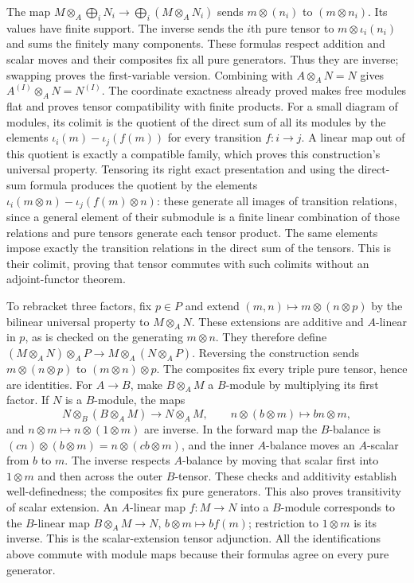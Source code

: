 \documentclass[11pt,a4paper,openany]{report}
\begin{document}
The map \(M\otimes_A\bigoplus_i N_i\to\bigoplus_i(M\otimes_A N_i)\) sends \(m\otimes(n_i)\) to \((m\otimes n_i)\). Its values have finite support. The inverse sends the \(i\)th pure tensor to \(m\otimes\iota_i(n_i)\) and sums the finitely many components. These formulas respect addition and scalar moves and their composites fix all pure generators. Thus they are inverse; swapping proves the first-variable version. Combining with \(A\otimes_A N=N\) gives \(A^{(I)}\otimes_A N=N^{(I)}\). The coordinate exactness already proved makes free modules flat and proves tensor compatibility with finite products. For a small diagram of modules, its colimit is the quotient of the direct sum of all its modules by the elements \(\iota_i(m)-\iota_j(f(m))\) for every transition \(f:i\to j\). A linear map out of this quotient is exactly a compatible family, which proves this construction's universal property. Tensoring its right exact presentation and using the direct-sum formula produces the quotient by the elements \(\iota_i(m\otimes n)-\iota_j(f(m)\otimes n)\): these generate all images of transition relations, since a general element of their submodule is a finite linear combination of those relations and pure tensors generate each tensor product. The same elements impose exactly the transition relations in the direct sum of the tensors. This is their colimit, proving that tensor commutes with such colimits without an adjoint-functor theorem.

To rebracket three factors, fix \(p\in P\) and extend \((m,n)\mapsto m\otimes(n\otimes p)\) by the bilinear universal property to \(M\otimes_A N\). These extensions are additive and \(A\)-linear in \(p\), as is checked on the generating \(m\otimes n\). They therefore define \((M\otimes_A N)\otimes_A P\to M\otimes_A(N\otimes_A P)\). Reversing the construction sends \(m\otimes(n\otimes p)\) to \((m\otimes n)\otimes p\). The composites fix every triple pure tensor, hence are identities. For \(A\to B\), make \(B\otimes_A M\) a \(B\)-module by multiplying its first factor. If \(N\) is a \(B\)-module, the maps \[
N\otimes_B(B\otimes_A M)\longrightarrow N\otimes_A M,
\qquad n\otimes(b\otimes m)\longmapsto bn\otimes m,
\] and \(n\otimes m\mapsto n\otimes(1\otimes m)\) are inverse. In the forward map the \(B\)-balance is \((cn)\otimes(b\otimes m)=n\otimes(cb\otimes m)\), and the inner \(A\)-balance moves an \(A\)-scalar from \(b\) to \(m\). The inverse respects \(A\)-balance by moving that scalar first into \(1\otimes m\) and then across the outer \(B\)-tensor. These checks and additivity establish well-definedness; the composites fix pure generators. This also proves transitivity of scalar extension. An \(A\)-linear map \(f:M\to N\) into a \(B\)-module corresponds to the \(B\)-linear map \(B\otimes_A M\to N\), \(b\otimes m\mapsto bf(m)\); restriction to \(1\otimes m\) is its inverse. This is the scalar-extension tensor adjunction. All the identifications above commute with module maps because their formulas agree on every pure generator.
\end{document}
